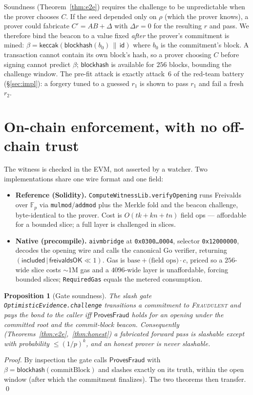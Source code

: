 \documentclass[11pt]{article}
\newtheorem{proposition}[theorem]{Proposition}
\newcommand{\Fp}{\mathbb{F}_p}
\newcommand{\keccak}{\mathsf{keccak}}
\begin{document}
Soundness (Theorem~\ref{thm:e2e}) requires the challenge to be unpredictable when the prover chooses
$C$. If the seed depended only on $\rho$ (which the prover knows), a prover could fabricate
$C'=AB+\Delta$ with $\Delta r=0$ for the resulting $r$ and pass. We therefore bind the beacon to a
value fixed \emph{after} the prover's commitment is mined: $\beta=\keccak(\mathsf{blockhash}(b_0)\,\|\,\mathsf{id})$
where $b_0$ is the commitment's block. A transaction cannot contain its own block's hash, so a prover
choosing $C$ before signing cannot predict $\beta$; $\mathsf{blockhash}$ is available for $256$ blocks,
bounding the challenge window. The pre-fit attack is exactly attack~6 of the red-team battery
(\S\ref{sec:impl}): a forgery tuned to a guessed $r_1$ is shown to pass $r_1$ and fail a fresh $r_2$.

\section{On-chain enforcement, with no off-chain trust}\label{sec:onchain}

The witness is checked in the EVM, not asserted by a watcher. Two implementations share one wire
format and one field:
\begin{itemize}[leftmargin=1.4em]
\item \textbf{Reference (Solidity).} \texttt{ComputeWitnessLib.verifyOpening} runs Freivalds over $\Fp$
via \texttt{mulmod}/\texttt{addmod} plus the Merkle fold and the beacon challenge, byte-identical to
the prover. Cost is $O(tk+kn+tn)$ field ops --- affordable for a bounded slice; a full layer is
challenged in slices.
\item \textbf{Native (precompile).} \texttt{aivmbridge} at \texttt{0x0300\dots0004}, selector
\texttt{0x12000000}, decodes the opening wire and calls the canonical Go verifier, returning
$(\mathsf{included}\,|\,\mathsf{freivaldsOK}\!\ll\!1)$. Gas is $\text{base}+\text{(field ops)}\cdot c$,
priced so a $256$-wide slice costs $\sim$1M gas and a $4096$-wide layer is unaffordable, forcing
bounded slices; \texttt{RequiredGas} equals the metered consumption.
\end{itemize}

\begin{proposition}[Gate soundness]\label{prop:gate}
The slash gate \texttt{OptimisticEvidence.challenge} transitions a commitment to \textsc{Fraudulent}
and pays the bond to the caller \emph{iff} $\mathsf{ProvesFraud}$ holds for an opening under the
committed root and the commit-block beacon. Consequently (Theorems~\ref{thm:e2e},~\ref{thm:honest}) a
fabricated forward pass is slashable except with probability $\leq(1/p)^k$, and an honest prover is
never slashable.
\end{proposition}
\begin{proof}
By inspection the gate calls $\mathsf{ProvesFraud}$ with $\beta=\mathsf{blockhash}(\text{commitBlock})$
and slashes exactly on its truth, within the open window (after which the commitment finalizes). The
two theorems then transfer. \qed
\end{proof}
\end{document}
